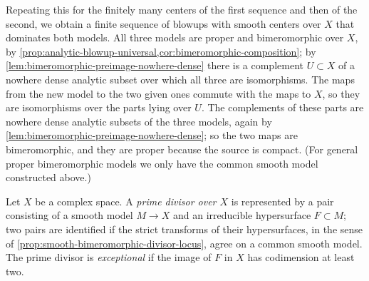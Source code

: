 Repeating this for the finitely many centers of the first sequence and then of the second, we obtain a finite sequence of blowups with smooth centers over $X$ that dominates both models. All three models are proper and bimeromorphic over $X$, by \cref{prop:analytic-blowup-universal,cor:bimeromorphic-composition}; by \cref{lem:bimeromorphic-preimage-nowhere-dense} there is a complement $U\subset X$ of a nowhere dense analytic subset over which all three are isomorphisms. The maps from the new model to the two given ones commute with the maps to $X$, so they are isomorphisms over the parts lying over $U$. The complements of these parts are nowhere dense analytic subsets of the three models, again by \cref{lem:bimeromorphic-preimage-nowhere-dense}; so the two maps are bimeromorphic, and they are proper because the source is compact. (For general proper bimeromorphic models we only have the common smooth model constructed above.)

\begin{definition}\label{def:prime-divisor-model}
Let $X$ be a complex space. A \emph{prime divisor over $X$} is represented by a pair consisting of a smooth model $M\to X$ and an irreducible hypersurface $F\subset M$; two pairs are identified if the strict transforms of their hypersurfaces, in the sense of \cref{prop:smooth-bimeromorphic-divisor-locus}, agree on a common smooth model. The prime divisor is \emph{exceptional} if the image of $F$ in $X$ has codimension at least two.
\end{definition}

